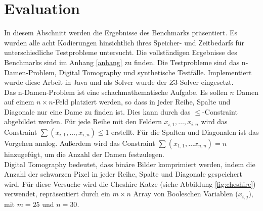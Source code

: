 \documentclass[a4,abstract=on]{scrartcl}
\newcommand*\stdsection{}
\let\stdsection\section
\renewcommand*\section{%
    \clearpage\ifodd\value{page}\else\mbox{}\clearpage\fi
    \stdsection}
\begin{document}
\section{Evaluation}
In diesem Abschnitt werden die Ergebnisse des Benchmarks präsentiert. Es wurden alle acht Kodierungen hinsichtlich ihres Speicher- und Zeitbedarfs für unterschiedliche Testprobleme untersucht. Die vollständigen Ergebnisse des Benchmarks sind im Anhang \ref{anhang} zu finden. Die Testprobleme sind das n-Damen-Problem, Digital Tomography und synthetische Testfälle. Implementiert wurde diese Arbeit in Java und als Solver wurde der $Z3$-Solver eingesetzt.\\
Das n-Damen-Problem ist eine schachmathematische Aufgabe. Es sollen $n$ Damen auf einem $n\times n$-Feld platziert werden, so dass in jeder Reihe, Spalte und Diagonale nur eine Dame zu finden ist. Dies kann durch das $\leq$-Constraint abgebildet werden. Für jede Reihe mit den Feldern $x_{i,1}, \dots, x_{i,n}$ wird das Constraint $\sum (x_{i,1}, \dots, x_{i,n}) \leq 1$ erstellt. Für die Spalten und Diagonalen ist das Vorgehen analog. Außerdem wird das Constraint $\sum (x_{1,1}, \dots x_{n,n})=n$ hinzugefügt, um die Anzahl der Damen festzulegen.\\
Digital Tomography bedeutet, dass binäre Bilder komprimiert werden, indem die Anzahl der schwarzen Pixel in jeder Reihe, Spalte und Diagonale gespeichert wird. Für diese Versuche wird die Cheshire Katze (siehe Abbildung \ref{fig:cheshire}) verwendet, repräsentiert durch ein $m \times n$ Array von Booleschen Variablen ($x_{i,j})$, mit $m=25$ und $n=30$. 
\end{document}
